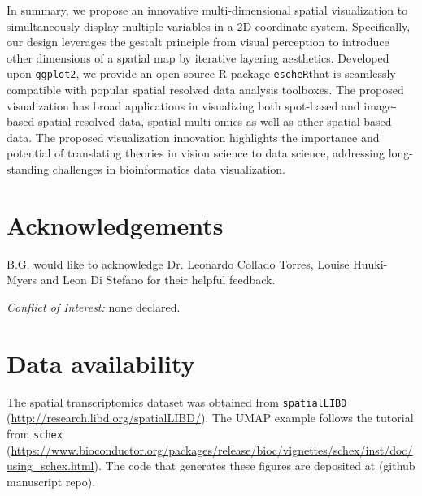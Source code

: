 \documentclass[11pt]{article}
\newcommand{\fixme}[1]{{\color{red} (#1)}}
\newcommand{\coloc}{\texttt{escheR}}
\begin{document}
\vspace{0.45in}
In summary, we propose an innovative multi-dimensional spatial visualization to simultaneously display multiple variables in a 2D coordinate system. Specifically, our design leverages the gestalt principle from visual perception to introduce other dimensions of a spatial map by iterative layering aesthetics. Developed upon \texttt{ggplot2}, we provide an open-source R package \coloc that is seamlessly compatible with popular spatial resolved data analysis toolboxes. The proposed visualization has broad applications in visualizing both spot-based and image-based spatial resolved data, spatial multi-omics as well as other spatial-based data. The proposed visualization innovation highlights the importance and potential of translating theories in vision science to data science, addressing long-standing challenges in bioinformatics data visualization.







\section*{Acknowledgements}
B.G. would like to acknowledge Dr. Leonardo Collado Torres, Louise Huuki-Myers and Leon Di Stefano for their helpful feedback.

\vspace{0.2in}
\noindent \textit{Conflict of Interest:} none declared.

\section*{Data availability}
The spatial transcriptomics dataset was obtained from \texttt{spatialLIBD} (\url{http://research.libd.org/spatialLIBD/}). The UMAP example follows the tutorial from \texttt{schex} (\url{https://www.bioconductor.org/packages/release/bioc/vignettes/schex/inst/doc/using_schex.html}). The code that generates these figures are deposited at \fixme{github manuscript repo}.
\end{document}
